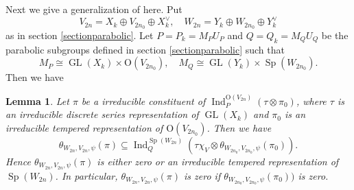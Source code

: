 \documentclass[article]{article}
\numberwithin{equation}{section}
\newtheorem{lemma}[theorem]{Lemma}
\theoremstyle{definition}
\DeclareMathOperator{\Ind}{Ind}
\DeclareMathOperator{\GL}{GL}
\DeclareMathOperator{\SP}{Sp}
\begin{document}
Next we give a generalization of \cite[Lemma C.4]{MR3166215} here. Put
$$V_{2n}=X_k\oplus V_{2n_0}\oplus X_k^{\vee}, \quad W_{2n}=Y_k\oplus W_{2n_0}\oplus Y_k^{\vee}$$ 
as in section \ref{sectionparabolic}. Let $P=P_{k}=M_{P} U_{P}$ and $Q=Q_{k}=M_{Q} U_{Q}$ be the parabolic subgroups defined in section \ref{sectionparabolic} such that 
$$M_{P} \cong \GL(X_k) \times \mathrm O(V_{2n_0}), \quad M_{Q} \cong \GL(Y_k) \times \SP(W_{2n_0}).$$
Then we have 
\begin{lemma}\label{12}
	Let $\pi$ be a irreducible constituent of $\Ind_{P}^{\mathrm O(V_{2n})}(\tau\otimes \pi_0)$, where $\tau$ is an irreducible discrete series representation of $\GL(X_k)$ and $\pi_0$ is an irreducible tempered representation of $\mathrm O(V_{2n_0})$. Then we have 
	$$
	\theta_{W_{2n},V_{2n},\psi}(\pi) \subseteq \Ind_{Q}^{\SP(W_{2n})}(\tau\chi_{V}\otimes \theta_{W_{2n_0},V_{2n_0},\psi}(\pi_0)).
	$$
 Hence $\theta_{W_{2n},V_{2n},\psi}(\pi)$ is either zero or an irreducible tempered representation of $\SP(W_{2n})$. In particular, $\theta_{W_{2n},V_{2n},\psi}(\pi)$ is zero if $\theta_{W_{2n_0},V_{2n_0},\psi}(\pi_0))$ is zero. 
\end{lemma}
\end{document}
